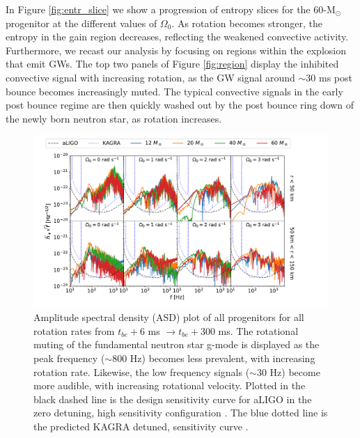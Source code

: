 \documentclass[twocolumn,times]{aastex62}  %
\newcommand{\Msun}{\ensuremath{\mathrm{M}_\odot}\xspace}
\begin{document}
In Figure \ref{fig:entr_slice} we show a progression of entropy slices  for the 60-\Msun progenitor at the different values of $\Omega_0$.  As rotation becomes stronger, the entropy in the gain region decreases, reflecting the weakened convective activity.  Furthermore, we recast our analysis by focusing on regions within the explosion that emit GWs.  The top two panels of Figure \ref{fig:region} display the inhibited convective signal with increasing rotation, as the GW signal around $\sim$30 ms post bounce becomes increasingly muted.  The typical convective signals in the early post bounce regime are then quickly washed out by the post bounce ring down of the newly born neutron star, as rotation increases.

\begin{figure}[t!]
  \centering     %
  \includegraphics[width=\textwidth]{figures/tbe6tbe300_combined_M1_long.pdf}
  \caption{Amplitude spectral density (ASD) plot of all progenitors for all rotation rates from $t_{be}+6$ ms $\rightarrow t_{be}+300$ ms.  The rotational muting of the fundamental neutron star g-mode is displayed as the peak frequency ($\sim 800$ Hz) becomes less prevalent, with increasing rotation rate.  Likewise, the low frequency signals ($\sim30$ Hz) become more audible, with increasing rotational velocity.  Plotted in the black dashed line is the design sensitivity curve for aLIGO in the zero detuning, high sensitivity configuration \citep{barsotti:2018}.  The blue dotted line is the predicted KAGRA detuned, sensitivity curve \citep{komari:2017}.}
  \label{fig:spetra_long}
\end{figure}
\end{document}
